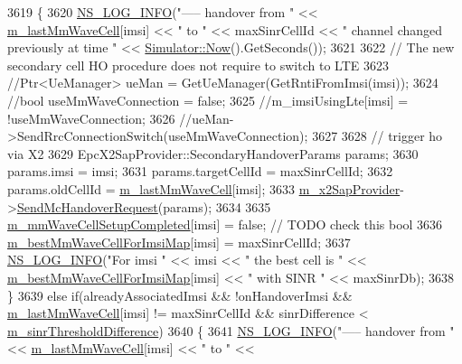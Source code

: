 \begin{DoxyCode}
3619     \{
3620       \hyperlink{group__logging_gafbd73ee2cf9f26b319f49086d8e860fb}{NS\_LOG\_INFO}(\textcolor{stringliteral}{"----- handover from "} << \hyperlink{classns3_1_1LteEnbRrc_a0d7b04f0383b0dc3f6a7360b87cbaeee}{m\_lastMmWaveCell}[imsi] << \textcolor{stringliteral}{" to "} << 
      maxSinrCellId << \textcolor{stringliteral}{" channel changed previously at time "} << \hyperlink{classns3_1_1Simulator_ac3178fa975b419f7875e7105be122800}{Simulator::Now}().GetSeconds());
3621 
3622       \textcolor{comment}{// The new secondary cell HO procedure does not require to switch to LTE}
3623       \textcolor{comment}{//Ptr<UeManager> ueMan = GetUeManager(GetRntiFromImsi(imsi));}
3624       \textcolor{comment}{//bool useMmWaveConnection = false;}
3625       \textcolor{comment}{//m\_imsiUsingLte[imsi] = !useMmWaveConnection;}
3626       \textcolor{comment}{//ueMan->SendRrcConnectionSwitch(useMmWaveConnection);}
3627 
3628       \textcolor{comment}{// trigger ho via X2}
3629       EpcX2SapProvider::SecondaryHandoverParams params;
3630       params.imsi = imsi;
3631       params.targetCellId = maxSinrCellId;
3632       params.oldCellId = \hyperlink{classns3_1_1LteEnbRrc_a0d7b04f0383b0dc3f6a7360b87cbaeee}{m\_lastMmWaveCell}[imsi];
3633       \hyperlink{classns3_1_1LteEnbRrc_ae8dc75f4f6f63b7736d86204a4beb415}{m\_x2SapProvider}->\hyperlink{classns3_1_1EpcX2SapProvider_a419d10f3f7f1808938a53439bed4f9eb}{SendMcHandoverRequest}(params);
3634 
3635       \hyperlink{classns3_1_1LteEnbRrc_ad19d6f4c123115e1d13e34609781ab20}{m\_mmWaveCellSetupCompleted}[imsi] = \textcolor{keyword}{false}; \textcolor{comment}{// TODO check this bool}
3636       \hyperlink{classns3_1_1LteEnbRrc_a38d5bf3d53b16596824f07d4b4a1eab7}{m\_bestMmWaveCellForImsiMap}[imsi] = maxSinrCellId;
3637       \hyperlink{group__logging_gafbd73ee2cf9f26b319f49086d8e860fb}{NS\_LOG\_INFO}(\textcolor{stringliteral}{"For imsi "} << imsi << \textcolor{stringliteral}{" the best cell is "} << 
      \hyperlink{classns3_1_1LteEnbRrc_a38d5bf3d53b16596824f07d4b4a1eab7}{m\_bestMmWaveCellForImsiMap}[imsi] << \textcolor{stringliteral}{" with SINR "} << maxSinrDb);
3638     \} 
3639     \textcolor{keywordflow}{else} \textcolor{keywordflow}{if}(alreadyAssociatedImsi && !onHandoverImsi && \hyperlink{classns3_1_1LteEnbRrc_a0d7b04f0383b0dc3f6a7360b87cbaeee}{m\_lastMmWaveCell}[imsi] != 
      maxSinrCellId && sinrDifference < \hyperlink{classns3_1_1LteEnbRrc_aef56a65c644f6ed3c5f28a540ded624f}{m\_sinrThresholdDifference})
3640     \{
3641       \hyperlink{group__logging_gafbd73ee2cf9f26b319f49086d8e860fb}{NS\_LOG\_INFO}(\textcolor{stringliteral}{"----- handover from "} << \hyperlink{classns3_1_1LteEnbRrc_a0d7b04f0383b0dc3f6a7360b87cbaeee}{m\_lastMmWaveCell}[imsi] << \textcolor{stringliteral}{" to "} << 

\end{DoxyCode}
